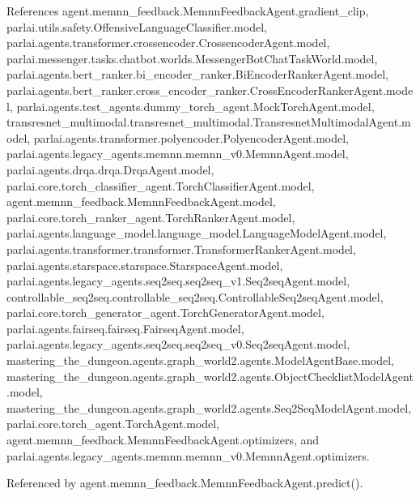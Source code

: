 References agent.\+memnn\+\_\+feedback.\+Memnn\+Feedback\+Agent.\+gradient\+\_\+clip, parlai.\+utils.\+safety.\+Offensive\+Language\+Classifier.\+model, parlai.\+agents.\+transformer.\+crossencoder.\+Crossencoder\+Agent.\+model, parlai.\+messenger.\+tasks.\+chatbot.\+worlds.\+Messenger\+Bot\+Chat\+Task\+World.\+model, parlai.\+agents.\+bert\+\_\+ranker.\+bi\+\_\+encoder\+\_\+ranker.\+Bi\+Encoder\+Ranker\+Agent.\+model, parlai.\+agents.\+bert\+\_\+ranker.\+cross\+\_\+encoder\+\_\+ranker.\+Cross\+Encoder\+Ranker\+Agent.\+model, parlai.\+agents.\+test\+\_\+agents.\+dummy\+\_\+torch\+\_\+agent.\+Mock\+Torch\+Agent.\+model, transresnet\+\_\+multimodal.\+transresnet\+\_\+multimodal.\+Transresnet\+Multimodal\+Agent.\+model, parlai.\+agents.\+transformer.\+polyencoder.\+Polyencoder\+Agent.\+model, parlai.\+agents.\+legacy\+\_\+agents.\+memnn.\+memnn\+\_\+v0.\+Memnn\+Agent.\+model, parlai.\+agents.\+drqa.\+drqa.\+Drqa\+Agent.\+model, parlai.\+core.\+torch\+\_\+classifier\+\_\+agent.\+Torch\+Classifier\+Agent.\+model, agent.\+memnn\+\_\+feedback.\+Memnn\+Feedback\+Agent.\+model, parlai.\+core.\+torch\+\_\+ranker\+\_\+agent.\+Torch\+Ranker\+Agent.\+model, parlai.\+agents.\+language\+\_\+model.\+language\+\_\+model.\+Language\+Model\+Agent.\+model, parlai.\+agents.\+transformer.\+transformer.\+Transformer\+Ranker\+Agent.\+model, parlai.\+agents.\+starspace.\+starspace.\+Starspace\+Agent.\+model, parlai.\+agents.\+legacy\+\_\+agents.\+seq2seq.\+seq2seq\+\_\+v1.\+Seq2seq\+Agent.\+model, controllable\+\_\+seq2seq.\+controllable\+\_\+seq2seq.\+Controllable\+Seq2seq\+Agent.\+model, parlai.\+core.\+torch\+\_\+generator\+\_\+agent.\+Torch\+Generator\+Agent.\+model, parlai.\+agents.\+fairseq.\+fairseq.\+Fairseq\+Agent.\+model, parlai.\+agents.\+legacy\+\_\+agents.\+seq2seq.\+seq2seq\+\_\+v0.\+Seq2seq\+Agent.\+model, mastering\+\_\+the\+\_\+dungeon.\+agents.\+graph\+\_\+world2.\+agents.\+Model\+Agent\+Base.\+model, mastering\+\_\+the\+\_\+dungeon.\+agents.\+graph\+\_\+world2.\+agents.\+Object\+Checklist\+Model\+Agent.\+model, mastering\+\_\+the\+\_\+dungeon.\+agents.\+graph\+\_\+world2.\+agents.\+Seq2\+Seq\+Model\+Agent.\+model, parlai.\+core.\+torch\+\_\+agent.\+Torch\+Agent.\+model, agent.\+memnn\+\_\+feedback.\+Memnn\+Feedback\+Agent.\+optimizers, and parlai.\+agents.\+legacy\+\_\+agents.\+memnn.\+memnn\+\_\+v0.\+Memnn\+Agent.\+optimizers.



Referenced by agent.\+memnn\+\_\+feedback.\+Memnn\+Feedback\+Agent.\+predict().

